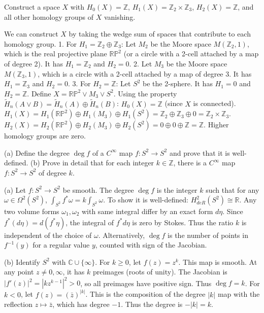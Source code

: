 \begin{exercise}
\label{geometry:2010:11}
Construct a space $X$ with $H_{0}(X) = \mathbb{Z}$, $H_{1}(X) = \mathbb{Z}_{2} \times \mathbb{Z}_{3}$, $H_{2}(X) = \mathbb{Z}$, and all other homology groups of $X$ vanishing.
\end{exercise}

\begin{solution}
We can construct $X$ by taking the wedge sum of spaces that contribute to each homology group.
1. For $H_1 = \mathbb{Z}_2 \oplus \mathbb{Z}_3$: Let $M_2$ be the Moore space $M(\mathbb{Z}_2, 1)$, which is the real projective plane $\mathbb{RP}^2$ (or a circle with a 2-cell attached by a map of degree 2). It has $H_1 = \mathbb{Z}_2$ and $H_2 = 0$.
2. Let $M_3$ be the Moore space $M(\mathbb{Z}_3, 1)$, which is a circle with a 2-cell attached by a map of degree 3. It has $H_1 = \mathbb{Z}_3$ and $H_2 = 0$.
3. For $H_2 = \mathbb{Z}$: Let $S^2$ be the 2-sphere. It has $H_1 = 0$ and $H_2 = \mathbb{Z}$.
Define $X = \mathbb{RP}^2 \vee M_3 \vee S^2$.
Using the property $\tilde{H}_n(A \vee B) = \tilde{H}_n(A) \oplus \tilde{H}_n(B)$:
$H_0(X) = \mathbb{Z}$ (since $X$ is connected).
$H_1(X) = H_1(\mathbb{RP}^2) \oplus H_1(M_3) \oplus H_1(S^2) = \mathbb{Z}_2 \oplus \mathbb{Z}_3 \oplus 0 = \mathbb{Z}_2 \times \mathbb{Z}_3$.
$H_2(X) = H_2(\mathbb{RP}^2) \oplus H_2(M_3) \oplus H_2(S^2) = 0 \oplus 0 \oplus \mathbb{Z} = \mathbb{Z}$.
Higher homology groups are zero.
\end{solution}

\begin{exercise}
\label{geometry:2010:12}
(a) Define the degree $\deg f$ of a $C^{\infty}$ map $f : S^{2} \to S^{2}$ and prove that it is well-defined.
(b) Prove in detail that for each integer $k \in \mathbb{Z}$, there is a $C^{\infty}$ map $f : S^{2} \to S^{2}$ of degree $k$.
\end{exercise}

\begin{solution}
(a) Let $f: S^2 \to S^2$ be smooth. The degree $\deg f$ is the integer $k$ such that for any $\omega \in \Omega^2(S^2)$, $\int_{S^2} f^* \omega = k \int_{S^2} \omega$.
To show it is well-defined: $H^2_{de R}(S^2) \cong \mathbb{R}$. Any two volume forms $\omega_1, \omega_2$ with same integral differ by an exact form $d\eta$. Since $f^*(d\eta) = d(f^*\eta)$, the integral of $f^* d\eta$ is zero by Stokes. Thus the ratio $k$ is independent of the choice of $\omega$.
Alternatively, $\deg f$ is the number of points in $f^{-1}(y)$ for a regular value $y$, counted with sign of the Jacobian.

(b) Identify $S^2$ with $\mathbb{C} \cup \{\infty\}$.
For $k \geq 0$, let $f(z) = z^k$. This map is smooth. At any point $z \neq 0, \infty$, it has $k$ preimages (roots of unity). The Jacobian is $|f'(z)|^2 = |k z^{k-1}|^2 > 0$, so all preimages have positive sign. Thus $\deg f = k$.
For $k < 0$, let $f(z) = (\bar{z})^{|k|}$. This is the composition of the degree $|k|$ map with the reflection $z \mapsto \bar{z}$, which has degree $-1$. Thus the degree is $-|k| = k$.
\end{solution}
